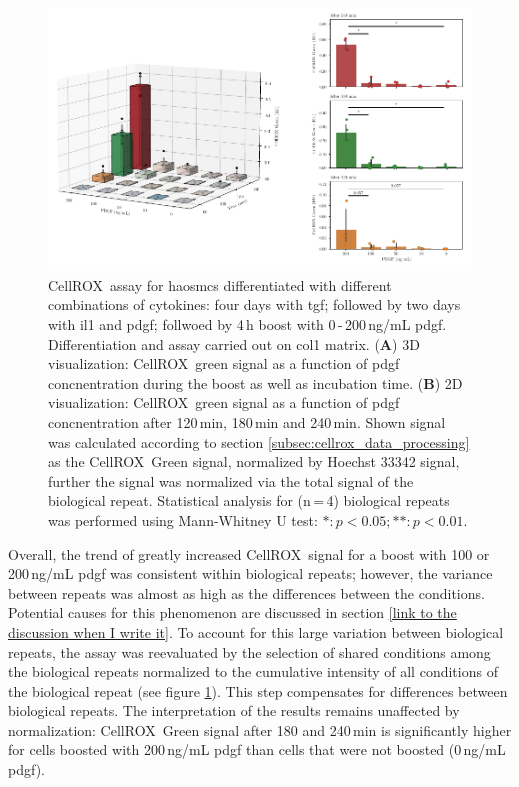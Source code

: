     \begin{figure}[h!]
    \capstart
        \centering
    	\includegraphics{Abbildung/CellROX_titration_norm.pdf}
    	\begin{minipage}{\captionwidth}
    		\caption[cellROX_titration_norm]{ \newline
            CellROX\texttrademark~assay for \acp{haosmc} differentiated with different combinations of cytokines: four days with \ac{tgf}; followed by two days with \ac{il1} and \ac{pdgf}; follwoed by 4\,h boost with 0\,-\,200\,ng/mL \ac{pdgf}. Differentiation and assay carried out on \ac{col1} matrix.
            (\textbf{A}) 3D visualization: CellROX\texttrademark~green signal as a function of \ac{pdgf} concnentration during the boost as well as incubation time.
            (\textbf{B}) 2D visualization: CellROX\texttrademark~green signal as a function of \ac{pdgf} concnentration after 120\,min, 180\,min and 240\,min.
            Shown signal was calculated according to section \ref{subsec:cellrox_data_processing} as the CellROX\texttrademark~Green signal, normalized by Hoechst 33342 signal, further the signal was normalized via the total signal of the biological repeat. Statistical analysis for (n\,=\,4) biological repeats was performed using Mann-Whitney U test: $*: p < 0.05; **: p < 0.01$.}
    		\label{fig:cellROX_titration_norm}
    	\end{minipage}
    \end{figure}

    Overall, the trend of greatly increased CellROX\texttrademark~signal for a boost with 100 or 200\,ng/mL \ac{pdgf} was consistent within biological repeats; however, the variance between repeats was almost as high as the differences between the conditions. Potential causes for this phenomenon are discussed in section \ref{link to the discussion when I write it}. To account for this large variation between biological repeats, the assay was reevaluated by the selection of shared conditions among the biological repeats normalized to the cumulative intensity of all conditions of the biological repeat (see figure \ref{fig:cellROX_titration_norm}). This step compensates for differences between biological repeats. The interpretation of the results remains unaffected by normalization: CellROX\texttrademark~Green signal after 180 and 240\,min is significantly higher for cells boosted with 200\,ng/mL \ac{pdgf} than cells that were not boosted (0\,ng/mL \ac{pdgf}).

